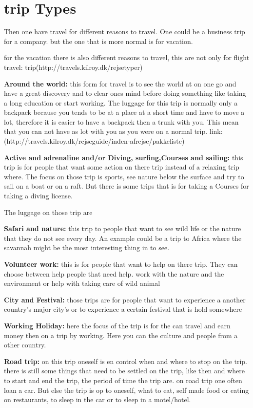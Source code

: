 \section{trip Types}
Then one have travel for different reasons to travel.
One could be a business trip for a company. but the one that is more normal is for vacation.

for the vacation there is also different reasons to travel, this are not only for flight travel:
trip(http://travels.kilroy.dk/rejsetyper)

\textbf{Around the world:}
this form for travel is to see the world at on one go and have a great discovery and to clear ones mind before doing something like taking a long education or start working.
The luggage for this trip is normally only a backpack because you tends to be at a place at a short time and have to move a lot, therefore it is easier to have a backpack then a trunk with you. This mean that you can not have as lot with you as you were on a normal trip.
link:(http://travels.kilroy.dk/rejseguide/inden-afrejse/pakkeliste)



\textbf{Active and adrenaline and/or Diving, surfing,Courses and sailing:}
this trip is for people that want some action on there trip instead of a relaxing trip where. The focus on those trip is sports, see nature below the surface and try to sail on a boat or on a raft. But there is some trips that is for taking a Courses for taking a diving license.

The luggage on those trip are 


\textbf{Safari and nature:}
this trip to people that want to see wild life or the nature that they do not see every day. An example could be a trip to Africa where the savannah might be the most interesting thing in to see.

\textbf{Volunteer work:}
this is for people that want to help on there trip. They can choose between help people that need help. work with the nature and the environment or help with taking care of wild animal

\textbf{City and Festival:}
those trips are for people that want to experience a another country's  major city's or to experience a certain festival that is hold somewhere 

\textbf{Working Holiday:}
here the focus of the trip is for the  can travel and earn money then on a trip by working. Here you can the culture and people from a other country.

\textbf{Road trip:}
on this trip oneself is en control when and where to stop on the trip. there is still some things that need to be settled on the trip, like then and where to start and end the trip, the period of time the trip are. on road trip one often loan a car. But else the trip is op to oneself, what to eat, self made food or eating on restaurants, to sleep in the car or to sleep in a motel/hotel.


